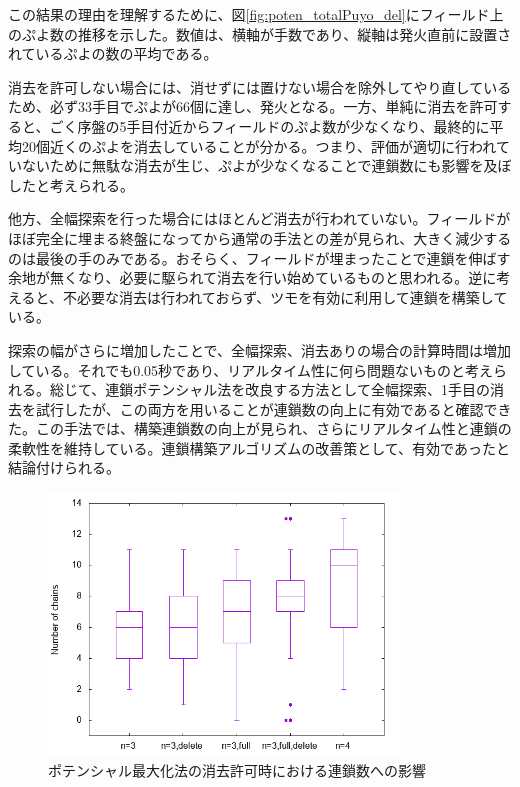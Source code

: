 \documentclass[12pt]{jreport}
\begin{document}
この結果の理由を理解するために、図\ref{fig:poten_totalPuyo_del}にフィールド上のぷよ数の推移を示した。数値は、横軸が手数であり、縦軸は発火直前に設置されているぷよの数の平均である。

消去を許可しない場合には、消せずには置けない場合を除外してやり直しているため、必ず33手目でぷよが66個に達し、発火となる。一方、単純に消去を許可すると、ごく序盤の5手目付近からフィールドのぷよ数が少なくなり、最終的に平均20個近くのぷよを消去していることが分かる。つまり、評価が適切に行われていないために無駄な消去が生じ、ぷよが少なくなることで連鎖数にも影響を及ぼしたと考えられる。

他方、全幅探索を行った場合にはほとんど消去が行われていない。フィールドがほぼ完全に埋まる終盤になってから通常の手法との差が見られ、大きく減少するのは最後の手のみである。おそらく、フィールドが埋まったことで連鎖を伸ばす余地が無くなり、必要に駆られて消去を行い始めているものと思われる。逆に考えると、不必要な消去は行われておらず、ツモを有効に利用して連鎖を構築している。

探索の幅がさらに増加したことで、全幅探索、消去ありの場合の計算時間は増加している。それでも0.05秒であり、リアルタイム性に何ら問題ないものと考えられる。総じて、連鎖ポテンシャル法を改良する方法として全幅探索、1手目の消去を試行したが、この両方を用いることが連鎖数の向上に有効であると確認できた。この手法では、構築連鎖数の向上が見られ、さらにリアルタイム性と連鎖の柔軟性を維持している。連鎖構築アルゴリズムの改善策として、有効であったと結論付けられる。


\begin{figure}[tb]
  \begin{center}
  \includegraphics[height=7cm]{graph/Potential/chain_del.png}
  \caption{ポテンシャル最大化法の消去許可時における連鎖数への影響} \label{fig:poten_chain_del}
\end{center}
\end{figure}
\end{document}
